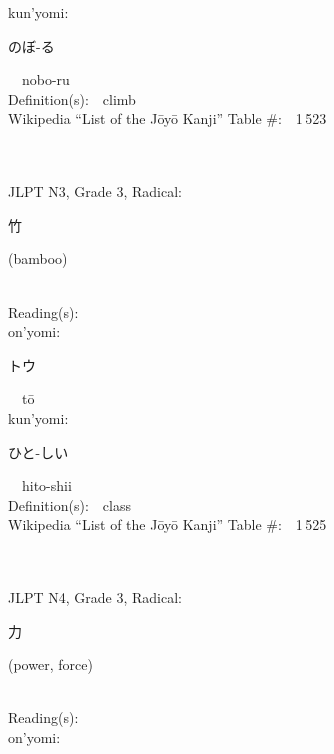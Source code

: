 \begin{multicols}{2}
{\hspace*{1em}}kun'yomi:\ \ \\
{\hspace*{2em}}{\begin{CJK}{UTF8}{min} のぼ-る \end{CJK}}\ \ nobo-ru\ \ \\
Definition(s):\ \ climb \\
Wikipedia ``List of the J\=oy\=o Kanji'' Table \#:\ \ 1\,523 \\
\ \ \\
{\fontsize{34pt}{40pt}  }\ \ \\  %
{JLPT N3, Grade 3, Radical:\ \ {\begin{CJK}{UTF8}{min} 竹 \end{CJK}} (bamboo) } \\
Reading(s):\ \ \\
{\hspace*{1em}}on'yomi:\ \ \\
{\hspace*{2em}}{\begin{CJK}{UTF8}{min} トウ \end{CJK}}\ \ t\=o\ \ \\
{\hspace*{1em}}kun'yomi:\ \ \\
{\hspace*{2em}}{\begin{CJK}{UTF8}{min} ひと-しい \end{CJK}}\ \ hito-shii\ \ \\
Definition(s):\ \ class \\
Wikipedia ``List of the J\=oy\=o Kanji'' Table \#:\ \ 1\,525 \\
\ \ \\
{\fontsize{34pt}{40pt}  }\ \ \\  %
{JLPT N4, Grade 3, Radical:\ \ {\begin{CJK}{UTF8}{min} 力 \end{CJK}} (power, force) } \\
Reading(s):\ \ \\
{\hspace*{1em}}on'yomi:\ \ \\

\end{multicols}
